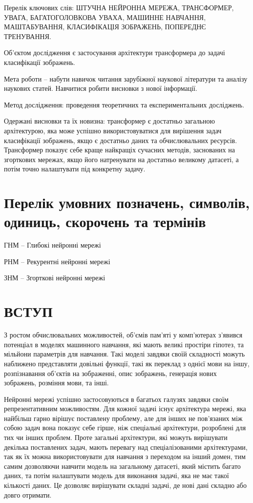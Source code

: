 \documentclass[a4paper,14pt]{extreport}
\newcommand\uchapter[1]{%
  \chapter*{#1}%
  \addcontentsline{toc}{chapter}{#1}}
\begin{document}
Перелік ключових слів: ШТУЧНА НЕЙРОННА МЕРЕЖА, ТРАНСФОРМЕР,
УВАГА, БАГАТОГОЛОВКОВА УВАХА, МАШИННЕ НАВЧАННЯ,
МАШТАБУВАННЯ, КЛАСИФІКАЦІЯ ЗОБРАЖЕНЬ,
ПОПЕРЕДНЄ ТРЕНУВАННЯ.

Об’єктом дослідження є застосування архітектури
трансформера до задачі класифікації зображень.

Мета роботи -- набути навичок читання зарубіжної наукової літератури та аналізу наукових статей. Навчитися робити висновки з нової інформації.

Метод дослідження: проведення теоретичних та експериментальних досліджень.

Одержані висновки та їх новизна: трансформер є достатньо загальною
архітектурою, яка може успішно використовуватися для вирішення задач
класифікації зображень, якщо є достатньо даних та обчислювальних ресурсів.
Трансформер показує себе краще найкращіх сучасних методів, заснованих на
згорткових мережах, якщо його натренувати на достатньо великому датасеті,
а потім точно налаштувати під конкретну задачу.

\newpage
\tableofcontents

\newpage
\chapter*{Перелік умовних позначень, символів, одиниць, скорочень та термінів}
ГНМ -- Глибокі нейронні мережі

РНМ -- Рекурентні нейронні мережі

ЗНМ -- Згорткові нейронні мережі



\newpage
{}
\setcounter{page}{7}
\uchapter{ВСТУП}
З ростом обчислювальних можливостей, об'ємів пам'яті у комп'ютерах
з'явився потенціал в моделях машинного навчання, які мають
великі простіри гіпотез, та мільйони параметрів для навчання.
Такі моделі завдяки своїй складності можуть наближено представляти
довільні функції, такі як переклад з однієї мови на іншу,
розпізнавання об'єктів на зображенні, опис зображень,
генерація нових зображень, розміння мови, та інші.

Нейронні мережі успішно застосовуються в багатьох галузях
завдяки своїм репрезентативним можливостям. Для кожної задачі
існує архітектура мережі, яка найбільш гарно вірішує поставлену
проблему, але для інших не пов'язаних між собою задач вона
показує себе гірше, ніж спеціальні архітектури, розроблені
для тих чи інших проблем. Проте загальні архітектури,
які можуть вирішувати декілька поставлених задач, мають
перевагу над спеціалізованими архітектурами, так як їх
можна використовувати для навчання з переходом на інший домен,
тим самим дозволяючи навчити модель на загальному датасеті,
який містить багато даних,
та потім налаштувати модель для виконання задачі, яка не має такої
кількості даних. Це дозволяє вирішувати складні задачі, де
нові дані складно або довго отримати.
\end{document}
